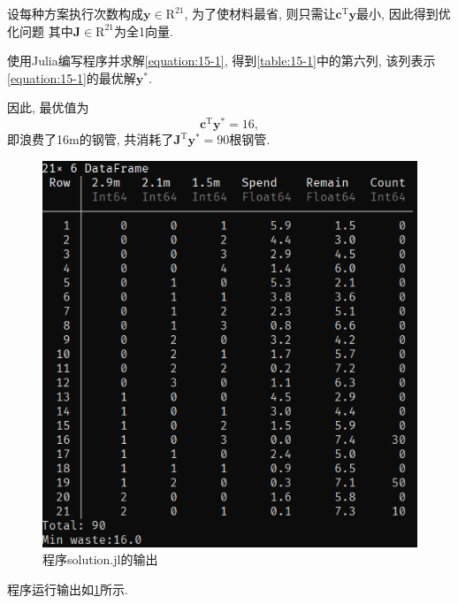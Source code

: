 设每种方案执行次数构成$\bm{y}\in\mathrm{R}^{21}$, 为了使材料最省, 则只需让$\bm{c}^\mathrm{T}\bm{y}$最小, 因此得到优化问题
其中$\bm{J}\in\mathrm{R}^{21}$为全1向量.

使用Julia编写程序并求解\cref{equation:15-1}, 得到\cref{table:15-1}中的第六列, 该列表示\cref{equation:15-1}的最优解$\bm{y}^*$.

因此, 最优值为
\begin{equation*}
    \bm{c}^\mathrm{T}\bm{y}^*=16,
\end{equation*}
即浪费了16m的钢管, 共消耗了$\bm{J}^\mathrm{T}\bm{y}^*=90$根钢管.

\begin{figure}[ht]
    \centering
    \includegraphics[scale=0.6]{figures/15-1.png}
    \caption{程序solution.jl的输出}
    \label{figure:15-1}
\end{figure}

程序运行输出如\cref{figure:15-1}所示.

